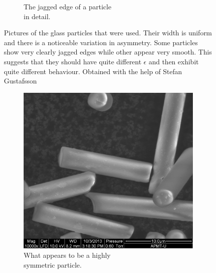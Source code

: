 \begin{figure}[H]
\begin{subfigure}[3b]{0.40\textwidth}
\caption{The jagged edge of a particle \\ in detail.}
\end{subfigure}
\caption{Pictures of the glass particles that were used. Their width is uniform and there is a noticeable variation in asymmetry. Some particles show very clearly jagged edges while other appear very smooth. This suggests that they should have quite different $\epsilon$ and then exhibit quite different behaviour. Obtained with the help of Stefan Gustafsson}
\label{fig:particlepictures}
\end{figure}
 
\begin{figure}[H]
\centering
\begin{subfigure}[3a]{0.40\textwidth}
\includegraphics[width=\textwidth]{figures/method/symmetric.png}
\caption{What appears to be a highly \\ symmetric particle.}\label{fig:symmetricparticle}
\end{subfigure}\hspace{1em}%
\begin{subfigure}[3b]{0.40\textwidth}

\end{subfigure}
\end{figure}
